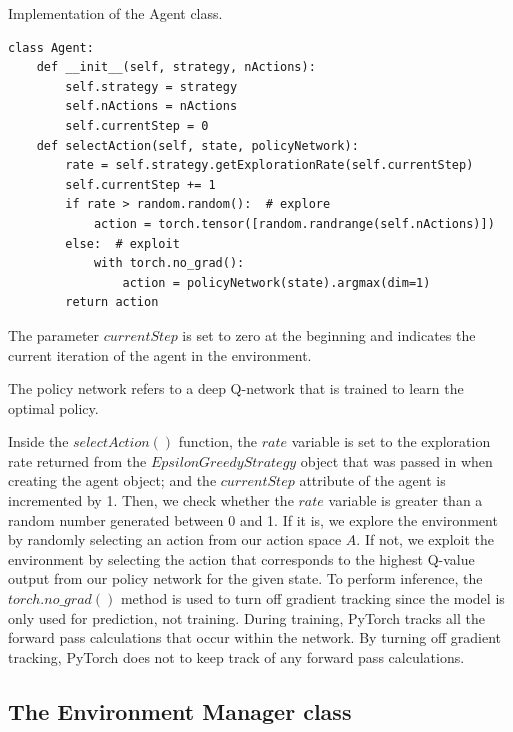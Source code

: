 \documentclass[12pt,oneside]{article}
\begin{document}
\begin{listing}[H]
\caption{Implementation of the Agent class.}
\label{code:agent}
\begin{tcolorbox}[]
\begin{verbatim}
class Agent:
    def __init__(self, strategy, nActions):
        self.strategy = strategy
        self.nActions = nActions
        self.currentStep = 0
    def selectAction(self, state, policyNetwork):
        rate = self.strategy.getExplorationRate(self.currentStep)
        self.currentStep += 1
        if rate > random.random():  # explore
            action = torch.tensor([random.randrange(self.nActions)])
        else:  # exploit
        	with torch.no_grad():
            	action = policyNetwork(state).argmax(dim=1)
        return action
\end{verbatim}
\end{tcolorbox}
\end{listing} 

The parameter $currentStep$ is set to zero at the beginning and indicates the current iteration of the agent in the environment.

The policy network refers to a deep Q-network that is trained to learn the optimal policy.

Inside the $selectAction()$ function, the $rate$ variable is set to the exploration rate returned from the $EpsilonGreedyStrategy$ object that was passed in when creating the agent object; and the $currentStep$ attribute of the agent is incremented by 1. 
Then, we check whether the $rate$ variable is greater than a random number generated between 0 and 1. If it is, we explore the environment by randomly selecting an action from our action space $A$. If not, we exploit the environment by selecting the action that corresponds to the highest Q-value output from our policy network for the given state. To perform inference, the $torch.no\_grad()$ method is used to turn off gradient tracking since the model is only used for prediction, not training. During training, PyTorch tracks all the forward pass calculations that occur within the network. By turning off gradient tracking,  PyTorch does not to keep track of any forward pass calculations.

\subsection{The Environment Manager class}
\end{document}
